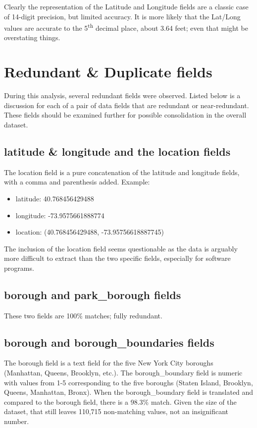 \documentclass[12pt, titlepage]{article}
\begin{document}
Clearly the representation of the Latitude and Longitude fields are a 
classic case of 14-digit precision, but limited accuracy. It is more likely 
that the Lat/Long values are accurate to the 5\textsuperscript{th} decimal place, 
about 3.64 feet; even that might be overstating things. 



\section{Redundant \& Duplicate fields}\label{sec:duplicates}
During this analysis, several redundant fields were observed. Listed below 
is a discussion for each of a pair of data fields that are redundant or 
near-redundant. These fields should be examined further for 
possible consolidation in the overall dataset.

\subsection{latitude \& longitude and the location fields}
\label{sec:latlong}
The location field is a pure concatenation of the latitude 
and longitude fields, with a comma and parenthesis 
added. Example:  

\begin{itemize}
	\item  latitude: 40.768456429488
	\item  longitude: -73.9575661888774
	\item  location: (40.768456429488, -73.95756618887745)
\end{itemize}

The inclusion of the location field seems questionable as the data is 
arguably more difficult to extract than the two specific fields, especially 
for software programs.

\subsection{borough and park\_borough fields}
\label{sec:parkborough}
These two fields are 100\% matches; fully redundant.

\subsection{borough and borough\_boundaries fields}
\label{sec:boroughboundaries}
The borough field is a text field for the five New York City boroughs (Manhattan, Queens, 
Brooklyn, etc.). The borough\_boundary field is numeric with values 
from 1-5 corresponding to the five boroughs (Staten Island, Brooklyn, 
Queens, Manhattan, Bronx). When the borough\_boundary field is 
translated and compared to the borough field, there is a 
98.3\% match. Given the size of the dataset, that still leaves 
110,715 non-matching values, not an insignificant number.  
\end{document}
